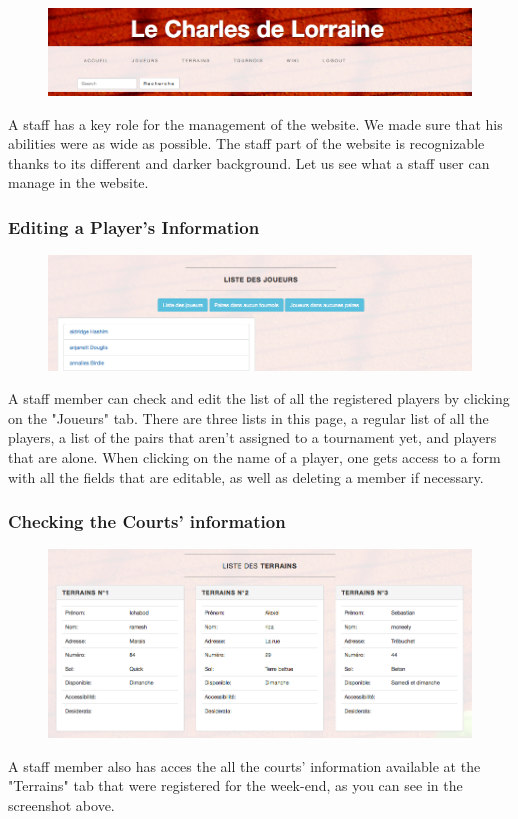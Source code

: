 \documentclass[a4paper, 12pt]{article}
\begin{document}
\begin{figure}[h]
\includegraphics[scale=0.5]{staffaccueil.png}
\end{figure}
\FloatBarrier
A staff has a key role for the management of the website. We made sure that his abilities were as wide as possible. The staff part of the website is recognizable thanks to its different and darker background. Let us see what a staff user can manage in the website.\\

\subsubsection*{Editing a Player's Information}
\begin{figure}[h]
\includegraphics[scale=0.5]{listeplayers.png}
\end{figure}

A staff member can check and edit the list of all the registered players by clicking on the "Joueurs" tab. There are three lists in this page, a regular list of all the players, a list of the pairs that aren't assigned to a tournament yet, and players that are alone. When clicking on the name of a player, one gets access to a form with all the fields that are editable, as well as deleting a member if necessary.\\

\subsubsection*{Checking the Courts' information}
\begin{figure}[h]
\includegraphics[scale=0.5]{courts.png}
\end{figure}
A staff member also has acces the all the courts' information available at the "Terrains" tab that were registered for the week-end, as you can see in the screenshot above. 
\end{document}
